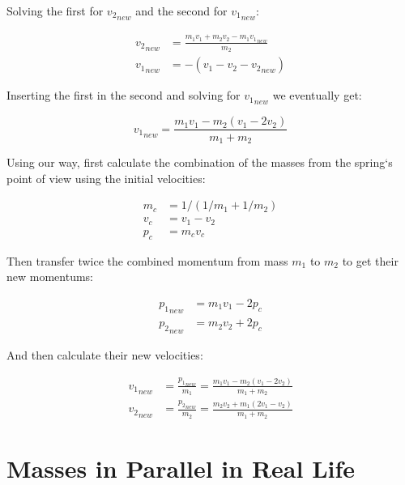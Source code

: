 \documentclass[]{elementary-physics}
\begin{document}
Solving the first for ${v_2}_{new}$ and the second for ${v_1}_{new}$:

\begin{subequations}
\begin{align}
{v_2}_{new} &= \frac{m_1 v_1 + m_2 v_2 - m_1 {v_1}_{new}}{m_2} \\
{v_1}_{new} &= -(v_1 - v_2 - {v_2}_{new})
\end{align}
\end{subequations}

Inserting the first in the second and solving for ${v_1}_{new}$ we eventually get:

\begin{equation}
{v_1}_{new} = \frac{m_1 v_1 - m_2(v_1-2 v_2)}{m_1 + m_2}
\end{equation}

Using our way, first calculate the combination of the masses from the spring`s point of view using the initial velocities:

\begin{subequations}
\begin{align}
m_c &= 1/(1/m_1 + 1/m_2) \\
v_c &= v_1 - v_2 \\
p_c &= m_c v_c
\end{align}
\end{subequations}

Then transfer twice the combined momentum from mass $m_1$ to $m_2$ to get their new momentums:

\begin{subequations}
\begin{align}
{p_1}_{new} &= m_1 v_1 - 2 p_c \\
{p_2}_{new} &= m_2 v_2 + 2 p_c
\end{align}
\end{subequations}

And then calculate their new velocities:

\begin{subequations}
\begin{align}
{v_1}_{new} &= \frac{{p_1}_{new}}{m_1} = \frac{m_1 v_1 - m_2(v_1 - 2 v_2)}{m_1 + m_2} \\
{v_2}_{new} &= \frac{{p_2}_{new}}{m_2} = \frac{m_2 v_2 + m_1(2 v_1 - v_2)}{m_1 + m_2}
\end{align}
\end{subequations}

\section{Masses in Parallel in Real Life}
\end{document}
